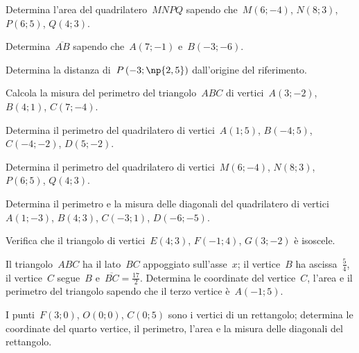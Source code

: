 \begin{esercizio}
\label{ese:D.21}
Determina l'area del quadrilatero~$MNPQ$ sapendo che~$M(6;-4)$, $N(8;3)$, $P(6;5)$, $Q(4;3)$.
\end{esercizio}

\begin{esercizio}
\label{ese:D.22}
Determina~$\overline{AB}$ sapendo che~$A(7;-1)$ e~$B(-3;-6)$.
\end{esercizio}

\begin{esercizio}
\label{ese:D.23}
Determina la distanza di~$P\left(-3;\np{2,5}\right)$ dall'origine del riferimento.
\end{esercizio}

\begin{esercizio}
\label{ese:D.24}
Calcola la misura del perimetro del triangolo~$ABC$ di vertici~$A(3;-2)$, $B(4;1)$, $C(7;-4)$.
\end{esercizio}

\begin{esercizio}
\label{ese:D.25}
Determina il perimetro del quadrilatero di vertici~$A(1;5)$, $B(-4;5)$, $C(-4;-2)$, $D(5;-2)$.
\end{esercizio}

\begin{esercizio}
\label{ese:D.26}
Determina il perimetro del quadrilatero di vertici~$M(6;-4)$, $N(8;3)$, $P(6;5)$, $Q(4;3)$.
\end{esercizio}

\begin{esercizio}
\label{ese:D.27}
Determina il perimetro e la misura delle diagonali del quadrilatero di vertici~$A(1;-3)$, $B(4;3)$, $C(-3;1)$, $D(-6;-5)$.
\end{esercizio}

\begin{esercizio}
\label{ese:D.28}
Verifica che il triangolo di vertici~$E(4;3)$, $F(-1;4)$, $G(3;-2)$ è isoscele.
\end{esercizio}

\begin{esercizio}
\label{ese:D.29}
Il triangolo~$ABC$ ha il lato~$BC$ appoggiato sull'asse~$x$; il vertice~$B$ ha ascissa~$\frac{5}{4}$,
il vertice~$C$ segue~$B$ e~$\overline{BC}=\frac{17}{2}$. Determina le coordinate del vertice~$C$,
l'area e il perimetro del triangolo sapendo che il terzo vertice è~$A(-1;5)$.
\end{esercizio}

\begin{esercizio}
\label{ese:D.30}
I punti~$F(3;0)$, $O(0;0)$, $C(0;5)$ sono i vertici di un rettangolo; determina le coordinate del quarto vertice, il perimetro,
l'area e la misura delle diagonali del rettangolo.
\end{esercizio}

